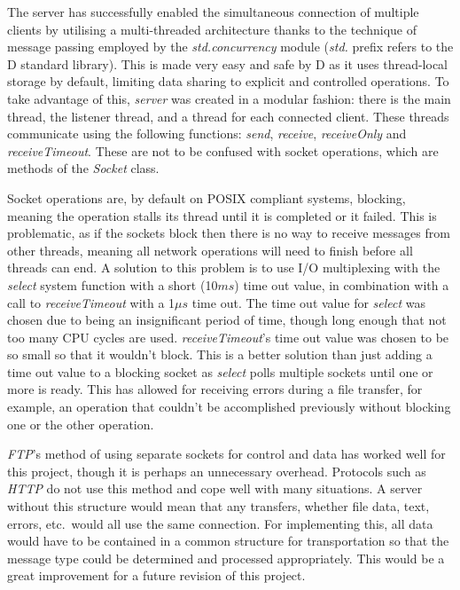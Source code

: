 \documentclass[a4paper]{article}
\begin{document}
The server has successfully enabled the simultaneous connection of multiple clients by utilising a multi-threaded architecture thanks to the technique of message passing employed by the \textit{std.concurrency} module (\textit{std.} prefix refers to the D standard library). This is made very easy and safe by D as it uses thread-local storage by default, limiting data sharing to explicit and controlled operations. To take advantage of this, \textit{server} was created in a modular fashion: there is the main thread, the listener thread, and a thread for each connected client. These threads communicate using the following functions: \textit{send}, \textit{receive}, \textit{receiveOnly} and \textit{receiveTimeout}. These are not to be confused with socket operations, which are methods of the \textit{Socket} class.

Socket operations are, by default on POSIX compliant systems, blocking, meaning the operation stalls its thread until it is completed or it failed. This is problematic, as if the sockets block then there is no way to receive messages from other threads, meaning all network operations will need to finish before all threads can end.
A solution to this problem is to use I/O multiplexing with the \textit{select} system function with a short (10$ms$) time out value, in combination with a call to \textit{receiveTimeout} with a 1$\mu s$ time out. The time out value for \textit{select} was chosen due to being an insignificant period of time, though long enough that not too many CPU cycles are used. \textit{receiveTimeout}'s time out value was chosen to be so small so that it wouldn't block. This is a better solution than just adding a time out value to a blocking socket as \textit{select} polls multiple sockets until one or more is ready. This has allowed for receiving errors during a file transfer, for example, an operation that couldn't be accomplished previously without blocking one or the other operation.

\textit{FTP}'s method of using separate sockets for control and data has worked well for this project, though it is perhaps an unnecessary overhead. Protocols such as \textit{HTTP} do not use this method and cope well with many situations. A server without this structure would mean that any transfers, whether file data, text, errors, etc.\ would all use the same connection. For implementing this, all data would have to be contained in a common structure for transportation so that the message type could be determined and processed appropriately. This would be a great improvement for a future revision of this project.
\end{document}
